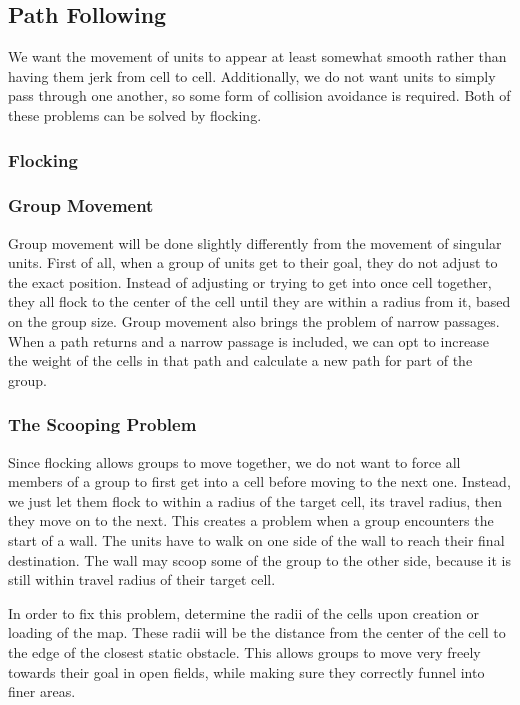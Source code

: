 \subsection{Path Following}
We want the movement of units to appear at least somewhat smooth rather than having them jerk from cell to cell. Additionally, we do not want units to simply pass through one another, so some form of collision avoidance is required. Both of these problems can be solved by flocking.

\subsubsection{Flocking}

\subsubsection{Group Movement}
Group movement will be done slightly differently from the movement of singular units. First of all, when a group of units get to their goal, they do not adjust to the exact position. Instead of adjusting or trying to get into once cell together, they all flock to the center of the cell until they are within a radius from it, based on the group size. Group movement also brings the problem of narrow passages. When a path returns and a narrow passage is included, we can opt to increase the weight of the cells in that path and calculate a new path for part of the group.

\subsubsection{The Scooping Problem}
Since flocking allows groups to move together, we do not want to force all members of a group to first get into a cell before moving to the next one. Instead, we just let them flock to within a radius of the target cell, its travel radius, then they move on to the next. This creates a problem when a group encounters the start of a wall. The units have to walk on one side of the wall to reach their final destination. The wall may scoop some of the group to the other side, because it is still within travel radius of their target cell.

In order to fix this problem, determine the radii of the cells upon creation or loading of the map. These radii will be the distance from the center of the cell to the edge of the closest static obstacle. This allows groups to move very freely towards their goal in open fields, while making sure they correctly funnel into finer areas.

